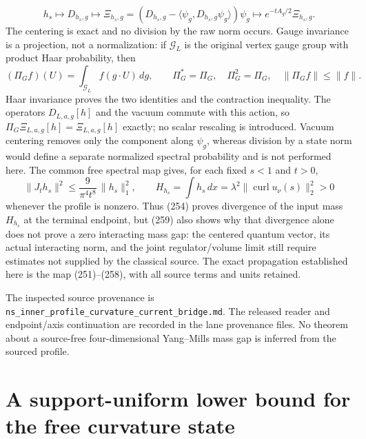 \documentclass[11pt]{article}
\begin{document}
\[
 h_s\longmapsto D_{h_s,g}
 \longmapsto \Xi_{h_s,g}=
 (D_{h_s,g}-\langle\psi_g,D_{h_s,g}\psi_g\rangle)\psi_g
 \longmapsto e^{-tA_g/2}\Xi_{h_s,g}.
 \tag{258}
\]
The centering is exact and no division by the raw norm occurs.  Gauge invariance is a projection, not a normalization: if $\mathcal G_L$ is the original vertex gauge group with product Haar probability, then
\[
 (\Pi_G f)(U)=\int_{\mathcal G_L}f(g\mathbin{\cdot}U)\,dg,
 \qquad \Pi_G^*=\Pi_G,\quad \Pi_G^2=\Pi_G,\quad \|\Pi_Gf\|\le\|f\|.
\]
Haar invariance proves the two identities and the contraction inequality.  The operators $D_{L,a,g}[h]$ and the vacuum commute with this action, so $\Pi_G\Xi_{L,a,g}[h]=\Xi_{L,a,g}[h]$ exactly; no scalar rescaling is introduced.  Vacuum centering removes only the component along $\psi_g$, whereas division by a state norm would define a separate normalized spectral probability and is not performed here.  The common free spectral map gives, for each fixed $s<1$ and $t>0$,
\[
 \|J_th_s\|^2\le \frac{9}{\pi^4t^8}\,\|h_s\|_1^2,
 \qquad
 H_{h_s}=\int h_s\,dx=\lambda^2\|\operatorname{curl}u_\nu(s)\|_2^2>0
\tag{259}
\]
whenever the profile is nonzero.  Thus (254) proves divergence of the input mass $H_{h_s}$ at the terminal endpoint, but (259) also shows why that divergence alone does not prove a zero interacting mass gap: the centered quantum vector, its actual interacting norm, and the joint regulator/volume limit still require estimates not supplied by the classical source.  The exact propagation established here is the map (251)--(258), with all source terms and units retained.

The inspected source provenance is
\texttt{ns\_inner\_profile\_curvature\_current\_bridge.md}.
The released reader and endpoint/axis continuation are recorded in the lane
provenance files.  No theorem about a source-free four-dimensional Yang--Mills
mass gap is inferred from the sourced profile.



\section{A support-uniform lower bound for the free curvature state}
\label{sec:support-uniform-free-state}
\end{document}
